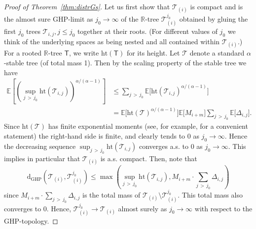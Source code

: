 \documentclass[10pt]{amsart}
\theoremstyle{definition}\newtheorem{defi}[theo]{Definition}\newtheorem{rema}[theo]{Remark}\newtheorem{exam}[theo]{Example}\newtheorem{exem}[theo]{Example}\newtheorem{nota}[theo]{Notation}
\newcommand{\E}[1]{\ensuremath{\mathbb{E} \left[#1 \right]}}
\newcommand{\GHP}{\mathrm{GHP}}
\newcommand{\rmd}{\mathrm{d}}
\newcommand{\htl}{\mathrm{ht}}
\newcommand{\cT}{\mathcal{T}}
\newcommand{\sT}{\mathsf{T}}
\newcommand{\R}{\mathbb{R}}
\newcommand{\bbE}{\mathbb{E}}
\begin{document}
\begin{proof}[Proof of Theorem~\ref{thm:distrGs}]
Let us first show that $\cT_{(i)}$ is compact and is the almost sure GHP-limit as $j_0 \rightarrow \infty$ of the $\R$-tree $\cT_{(i)}^{j_0}$ obtained by gluing the first $j_0$ trees $\cT_{i,j},j\leq j_0$ together at their roots. (For different values of $j_0$ we think of the underlying spaces as being nested and all contained within $\cT_{(i)}$.) For a rooted $\R$-tree $\sT$, we write $\htl(\sT)$ for its height. Let $\cT$ denote a standard $\alpha$-stable tree (of total mass 1). Then by the scaling property of the stable tree we have
\begin{align*}
\E{ \left(\sup_{j\,>\,j_0}\htl\left(\cT_{i,j}\right)\right)^{\alpha/(\alpha-1)}}
&\le \sum_{j\,>\,j_0} \bbE\big[\htl\left(\cT_{i,j}\right)^{\alpha/(\alpha-1)}\big]\\
&= \bbE\big[\htl(\cT)^{\alpha/(\alpha-1)}\big] \bbE\big[M_{i+m}\big] \sum_{j\,>\,j_0} \bbE\big[\Delta_{i,j}\big].
\end{align*}
Since $\htl(\cT)$ has finite exponential moments (see, for example, \cite[equation~(2)]{Kortchemski} for a convenient statement) the right-hand side is finite, and clearly tends to 0 as $j_0 \to \infty$. Hence the decreasing sequence $\sup_{j\,>\,j_0}\htl(\cT_{i,j})$ converges a.s. to 0 as $j_0 \to \infty$. This implies in particular that $\cT_{(i)}$ is a.s. compact. Then, note that
\[
\rmd_{\GHP}\left(\cT_{(i)},\cT_{(i)}^{j_0}\right)\le \max\left(\sup_{j\,>\,j_0}\htl\left(\cT_{i,j}\right), M_{i+m} \cdot \sum_{j\,>\,j_0} \Delta_{i,j} \right)
\]
since $M_{i+m} \cdot \sum_{j\,>\,j_0} \Delta_{i,j}$ is the total mass of $\cT_{(i)} \setminus \cT_{(i)}^{j_0}$. This total mass also converges to 0. Hence, $\cT_{(i)}^{j_0} \to \cT_{(i)}$ almost surely as $j_0 \to \infty$ with respect to the GHP-topology.


\end{proof}
\end{document}
